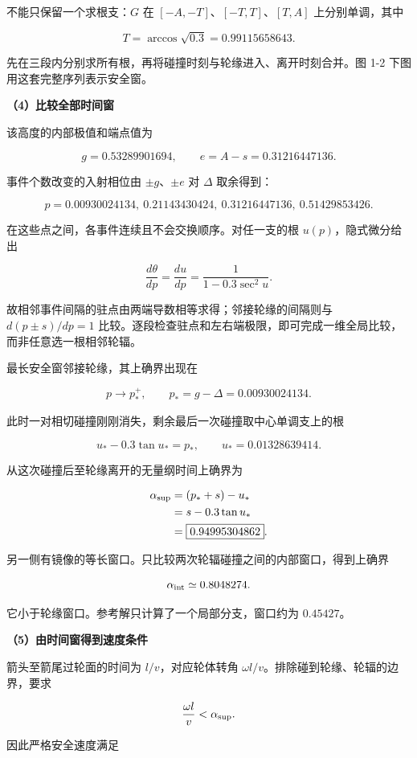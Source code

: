 \documentclass[12pt,a4paper,UTF8]{ctexart}
\begin{document}
不能只保留一个求根支：\(G\) 在 \([-A,-T]\)、\([-T,T]\)、\([T,A]\)
上分别单调，其中

\[T=\arccos\sqrt{0.3}=0.99115658643.\]

先在三段内分别求所有根，再将碰撞时刻与轮缘进入、离开时刻合并。图 1-2
下图用这套完整序列表示安全窗。

\textbf{（4）比较全部时间窗}

该高度的内部极值和端点值为

\[g=0.53289901694,\qquad e=A-s=0.31216447136.\]

事件个数改变的入射相位由 \(\pm g\)、\(\pm e\) 对 \(\Delta\) 取余得到：

\[p=0.00930024134,\ 0.21143430424,\
0.31216447136,\ 0.51429853426.\]

在这些点之间，各事件连续且不会交换顺序。对任一支的根
\(u(p)\)，隐式微分给出

\[\frac{d\theta}{dp}=\frac{du}{dp}
=\frac1{1-0.3\sec^2u}.\]

故相邻事件间隔的驻点由两端导数相等求得；邻接轮缘的间隔则与
\(d(p\pm s)/dp=1\)
比较。逐段检查驻点和左右端极限，即可完成一维全局比较，而非任意选一根相邻轮辐。

最长安全窗邻接轮缘，其上确界出现在

\[p\longrightarrow p_*^+,\qquad p_*=g-\Delta=0.00930024134.\]

此时一对相切碰撞刚刚消失，剩余最后一次碰撞取中心单调支上的根

\[u_*-0.3\tan u_*=p_*,\qquad u_*=0.01328639414.\]

从这次碰撞后至轮缘离开的无量纲时间上确界为

\[\begin{aligned}
\alpha_{\rm sup}&=(p_*+s)-u_*\\
&=s-0.3\tan u_*\\
&=\boxed{0.94995304862}.
\end{aligned}\]

另一侧有镜像的等长窗口。只比较两次轮辐碰撞之间的内部窗口，得到上确界

\[\alpha_{\rm int}\simeq0.8048274.\]

它小于轮缘窗口。参考解只计算了一个局部分支，窗口约为 \(0.45427\)。

\textbf{（5）由时间窗得到速度条件}

箭头至箭尾过轮面的时间为 \(l/v\)，对应轮体转角
\(\omega l/v\)。排除碰到轮缘、轮辐的边界，要求

\[\frac{\omega l}{v}<\alpha_{\rm sup}.\]

因此严格安全速度满足
\end{document}
